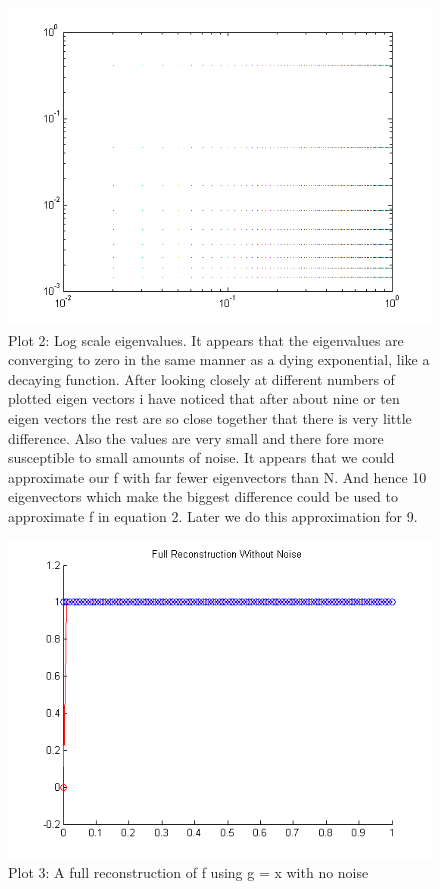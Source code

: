 \documentclass[12pt]{article}
\begin{document}
\begin{center}
\begin{figure}[H]
\includegraphics[scale=1]{plot2.png}
\caption{Plot 2: Log scale eigenvalues. It appears that the eigenvalues are converging to zero in the same manner as a dying exponential, like a decaying function. After looking closely at different numbers of plotted eigen vectors i have noticed that after about nine or ten eigen vectors the rest are so close together that there is very little difference. Also the values are very small and there fore more susceptible to small amounts of noise. It appears that we could approximate our f with far fewer eigenvectors than N. And hence 10 eigenvectors which make the biggest difference could be used to approximate f in equation 2. Later we do this approximation for 9.}
\end{figure}

\begin{figure}[H]
\includegraphics[scale=1]{plot3.png}
\caption{Plot 3: A full reconstruction of f using g = x with no noise}
\end{figure}


\end{center}
\end{document}

